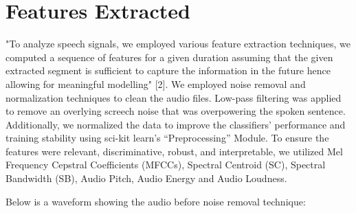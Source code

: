\documentclass[conference]{IEEEtran}
\begin{document}
\section{Features Extracted}

"To analyze speech signals, we employed various feature extraction techniques, we computed a sequence of features for a given duration assuming that the given extracted segment is sufficient to capture the information in the future hence allowing for meaningful modelling" [2]. 
We employed noise removal and normalization techniques to clean the audio files. Low-pass filtering was applied to remove an overlying screech noise that was overpowering the spoken sentence. 
Additionally, we normalized the data to improve the classifiers’ performance and training stability using sci-kit learn’s “Preprocessing” Module.
To ensure the features were relevant, discriminative, robust, and interpretable, we utilized Mel Frequency Cepstral Coefficients (MFCCs), Spectral Centroid (SC), Spectral Bandwidth (SB), Audio Pitch, Audio Energy and Audio Loudness.

Below is a waveform showing the audio before noise removal technique:
\end{document}
